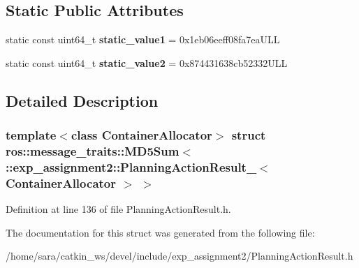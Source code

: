 \subsection*{Static Public Attributes}
\begin{DoxyCompactItemize}
\item 
\mbox{\label{structros_1_1message__traits_1_1MD5Sum_3_01_1_1exp__assignment2_1_1PlanningActionResult___3_01ContainerAllocator_01_4_01_4_a48a553b4bfe24d0ebee36fa3687fa101}} 
static const uint64\+\_\+t {\bfseries static\+\_\+value1} = 0x1eb06eeff08fa7ea\+U\+LL
\item 
\mbox{\label{structros_1_1message__traits_1_1MD5Sum_3_01_1_1exp__assignment2_1_1PlanningActionResult___3_01ContainerAllocator_01_4_01_4_ab644e66bba5640be0f98f0dab665aba5}} 
static const uint64\+\_\+t {\bfseries static\+\_\+value2} = 0x874431638cb52332\+U\+LL
\end{DoxyCompactItemize}


\subsection{Detailed Description}
\subsubsection*{template$<$class Container\+Allocator$>$\newline
struct ros\+::message\+\_\+traits\+::\+M\+D5\+Sum$<$ \+::exp\+\_\+assignment2\+::\+Planning\+Action\+Result\+\_\+$<$ Container\+Allocator $>$ $>$}



Definition at line 136 of file Planning\+Action\+Result.\+h.



The documentation for this struct was generated from the following file\+:\begin{DoxyCompactItemize}
\item 
/home/sara/catkin\+\_\+ws/devel/include/exp\+\_\+assignment2/Planning\+Action\+Result.\+h\end{DoxyCompactItemize}
